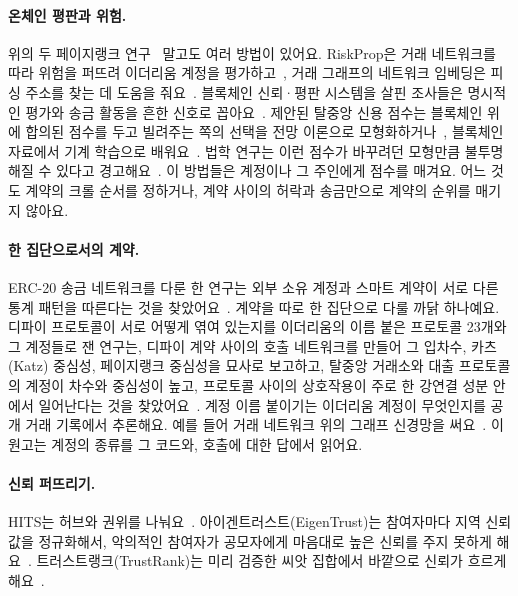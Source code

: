 \paragraph{온체인 평판과 위험.}
위의 두 페이지랭크 연구~\cite{do2023hodgerank,do2023awp} 말고도 여러 방법이 있어요. RiskProp은 거래 네트워크를 따라 위험을 퍼뜨려 이더리움 계정을 평가하고~\cite{lin2025riskprop}, 거래 그래프의 네트워크 임베딩은 피싱 주소를 찾는 데 도움을 줘요~\cite{wu2022phishers}. 블록체인 신뢰·평판 시스템을 살핀 조사들은 명시적인 평가와 송금 활동을 흔한 신호로 꼽아요~\cite{bellini2020trust,almasoud2020reputation}. 제안된 탈중앙 신용 점수는 블록체인 위에 합의된 점수를 두고 빌려주는 쪽의 선택을 전망 이론으로 모형화하거나~\cite{hassija2020lending}, 블록체인 자료에서 기계 학습으로 배워요~\cite{kotb2023credit}. 법학 연구는 이런 점수가 바꾸려던 모형만큼 불투명해질 수 있다고 경고해요~\cite{packin2024credit}. 이 방법들은 계정이나 그 주인에게 점수를 매겨요. 어느 것도 계약의 크롤 순서를 정하거나, 계약 사이의 허락과 송금만으로 계약의 순위를 매기지 않아요.

\paragraph{한 집단으로서의 계약.}
ERC-20 송금 네트워크를 다룬 한 연구는 외부 소유 계정과 스마트 계약이 서로 다른 통계 패턴을 따른다는 것을 찾았어요~\cite{mukhia2026erc20}. 계약을 따로 한 집단으로 다룰 까닭 하나예요. 디파이 프로토콜이 서로 어떻게 엮여 있는지를 이더리움의 이름 붙은 프로토콜 23개와 그 계정들로 잰 연구는, 디파이 계약 사이의 호출 네트워크를 만들어 그 입차수, 카츠(Katz) 중심성, 페이지랭크 중심성을 묘사로 보고하고, 탈중앙 거래소와 대출 프로토콜의 계정이 차수와 중심성이 높고, 프로토콜 사이의 상호작용이 주로 한 강연결 성분 안에서 일어난다는 것을 찾았어요~\cite{kitzler2023defi}. 계정 이름 붙이기는 이더리움 계정이 무엇인지를 공개 거래 기록에서 추론해요. 예를 들어 거래 네트워크 위의 그래프 신경망을 써요~\cite{lin2024whoiswho}. 이 원고는 계정의 종류를 그 코드와, 호출에 대한 답에서 읽어요.

\paragraph{신뢰 퍼뜨리기.}
HITS는 허브와 권위를 나눠요~\cite{kleinberg1999hits}. 아이겐트러스트(EigenTrust)는 참여자마다 지역 신뢰 값을 정규화해서, 악의적인 참여자가 공모자에게 마음대로 높은 신뢰를 주지 못하게 해요~\cite{kamvar2003eigentrust}. 트러스트랭크(TrustRank)는 미리 검증한 씨앗 집합에서 바깥으로 신뢰가 흐르게 해요~\cite{gyongyi2004trustrank}.

